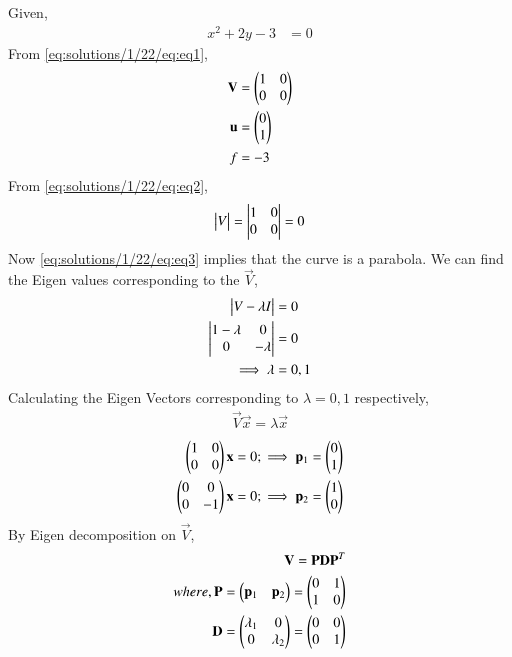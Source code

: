 Given, 
\begin{align}
	x^2 + 2y - 3 &= 0 \label{eq:solutions/1/22/eq:eq1}
\end{align}
From \eqref{eq:solutions/1/22/eq:eq1}, 
\begin{align} 
    \mathbf{V} &= \begin{pmatrix}1 & 0 \\ 0 & 0\end{pmatrix} \label{eq:solutions/1/22/eq:eq2} \\
    \mathbf{u} &= \begin{pmatrix}0 \\ 1\end{pmatrix} \\
    f &= -3
\end{align}
From \eqref{eq:solutions/1/22/eq:eq2},
\begin{align}
    \begin{vmatrix}V\end{vmatrix} = \begin{vmatrix}1 & 0 \\ 0 & 0\end{vmatrix} = 0 \label{eq:solutions/1/22/eq:eq3}
\end{align}
Now \eqref{eq:solutions/1/22/eq:eq3} implies that the curve is a parabola. We can find the Eigen values corresponding to the $\vec{V}$,
\begin{align}
    \begin{vmatrix}V-\lambda I\end{vmatrix} &= 0 \nonumber \\
    \begin{vmatrix}1-\lambda & 0 \\ 0 & -\lambda\end{vmatrix} &= 0 \nonumber \\
    \implies \lambda &= 0,1 \label{eq:solutions/1/22/eq:eq4}
\end{align}
Calculating the Eigen Vectors corresponding to $\lambda=0,1$ respectively,
\begin{align}
    \vec{V}\vec{x} = \lambda\vec{x} \nonumber 
\end{align}
\begin{align}
    \begin{pmatrix}1 & 0 \\ 0 & 0\end{pmatrix}\mathbf{x} = 0;\implies \mathbf{p}_1 = \begin{pmatrix}0 \\ 1\end{pmatrix} \label{eq:solutions/1/22/eq:eq5} \\
    \begin{pmatrix}0 & 0 \\ 0 & -1\end{pmatrix}\mathbf{x} = 0;\implies \mathbf{p}_2 = \begin{pmatrix}1 \\ 0\end{pmatrix} \label{eq:solutions/1/22/eq:eq6}
\end{align}
By Eigen decomposition on $\vec{V}$,
\begin{align}
    \mathbf{V} = \mathbf{P}\mathbf{D}\mathbf{P}^T \nonumber \\
    where, \mathbf{P} = \begin{pmatrix}\mathbf{p}_1 & \mathbf{p}_2\end{pmatrix} = \begin{pmatrix}0 & 1 \\ 1 & 0\end{pmatrix} \label{eq:solutions/1/22/eq:eq7} \\
    \mathbf{D} = \begin{pmatrix}\lambda_1 & 0 \\ 0 & \lambda_2\end{pmatrix} = \begin{pmatrix}0 & 0 \\ 0 & 1\end{pmatrix} \label{eq:solutions/1/22/eq:eq8}
\end{align}
